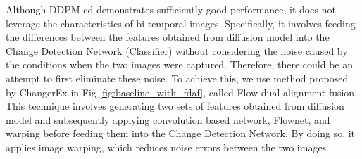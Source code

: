 \documentclass[../main.tex]{subfiles}
\begin{document}
\textbf{}
Although DDPM-cd demonstrates sufficiently good performance, it does not leverage the characteristics of bi-temporal images. Specifically, it involves feeding the differences between the features obtained from diffusion model into the Change Detection Network (Classifier) without considering the noise caused by the conditions when the two images were captured. Therefore, there could be an attempt to first eliminate these noise. To achieve this, we use method proposed by ChangerEx in Fig \ref{fig:baseline_with_fdaf}, called Flow dual-alignment fusion\cite{fang2023changerex}. This technique involves generating two sets of features obtained from diffusion model and subsequently applying convolution based network, Flownet, and warping before feeding them into the Change Detection Network. By doing so, it applies image warping, which reduces noise errors between the two images.
\end{document}
